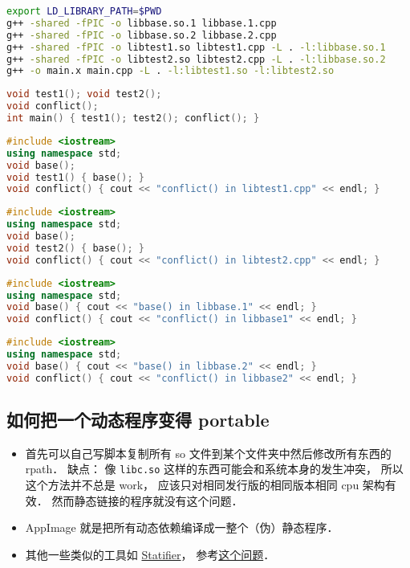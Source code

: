 \begin{lstlisting}[language=bash, caption=make.sh（注意要 source make.sh 而不是 ./make.sh）]
export LD_LIBRARY_PATH=$PWD
g++ -shared -fPIC -o libbase.so.1 libbase.1.cpp
g++ -shared -fPIC -o libbase.so.2 libbase.2.cpp
g++ -shared -fPIC -o libtest1.so libtest1.cpp -L . -l:libbase.so.1
g++ -shared -fPIC -o libtest2.so libtest2.cpp -L . -l:libbase.so.2
g++ -o main.x main.cpp -L . -l:libtest1.so -l:libtest2.so
\end{lstlisting}

\begin{lstlisting}[language=cpp, caption=main.cpp]
void test1(); void test2();
void conflict();
int main() { test1(); test2(); conflict(); }
\end{lstlisting}

\begin{lstlisting}[language=cpp, caption=libtest1.cpp]
#include <iostream>
using namespace std;
void base();
void test1() { base(); }
void conflict() { cout << "conflict() in libtest1.cpp" << endl; }
\end{lstlisting}

\begin{lstlisting}[language=cpp, caption=libtest2.cpp]
#include <iostream>
using namespace std;
void base();
void test2() { base(); }
void conflict() { cout << "conflict() in libtest2.cpp" << endl; }
\end{lstlisting}

\begin{lstlisting}[language=cpp, caption=libtest1.cpp]
#include <iostream>
using namespace std;
void base() { cout << "base() in libbase.1" << endl; }
void conflict() { cout << "conflict() in libbase1" << endl; }
\end{lstlisting}

\begin{lstlisting}[language=cpp, caption=libtest2.cpp]
#include <iostream>
using namespace std;
void base() { cout << "base() in libbase.2" << endl; }
void conflict() { cout << "conflict() in libbase2" << endl; }
\end{lstlisting}

\subsection{如何把一个动态程序变得 portable}
\begin{itemize}
\item 首先可以自己写脚本复制所有 so 文件到某个文件夹中然后修改所有东西的 rpath． 缺点： 像 \verb|libc.so| 这样的东西可能会和系统本身的发生冲突， 所以这个方法并不总是 work， 应该只对相同发行版的相同版本相同 cpu 架构有效． 然而静态链接的程序就没有这个问题．
\item AppImage 就是把所有动态依赖编译成一整个（伪）静态程序．
\item 其他一些类似的工具如 \href{https://statifier.sourceforge.net/}{Statifier}， 参考\href{https://askubuntu.com/questions/537479/is-there-any-open-source-way-to-make-a-static-from-a-dynamic-executable-with-no}{这个问题}．
\end{itemize}
